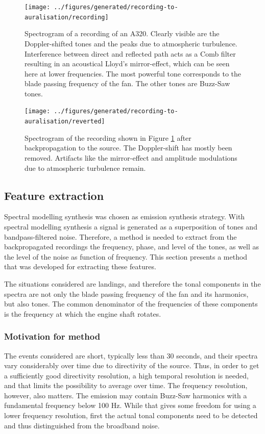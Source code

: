 \begin{figure}[H]
  \centering
  \texttt{[image: ../figures/generated/recording-to-auralisation/recording]}
  \caption{
    Spectrogram of a recording of an A320. Clearly visible are the
    Doppler-shifted tones and the peaks due to atmospheric turbulence.
    Interference between direct and reflected path acts as a Comb filter resulting
    in an acoustical Lloyd's mirror-effect, which can be seen here at lower
    frequencies. The most powerful tone corresponds to the blade passing frequency
    of the fan. The other tones are Buzz-Saw tones.}
  \label{fig:recording}
\end{figure}

\begin{figure}[H]
  \centering
  \texttt{[image: ../figures/generated/recording-to-auralisation/reverted]}
  \caption{Spectrogram of the recording shown in Figure \ref{fig:recording} after backpropagation to the source. The Doppler-shift has mostly been removed. Artifacts like the mirror-effect and amplitude modulations due to atmospheric turbulence remain.}
  \label{fig:backpropagated}
\end{figure}

\subsection{Feature extraction}
Spectral modelling synthesis was chosen as emission synthesis strategy. With
spectral modelling synthesis a signal is generated as a superposition of tones
and bandpass-filtered noise.
Therefore, a method is needed to extract from the backpropagated recordings the
frequency, phase, and level of the tones, as well as the level of the noise as
function of frequency. This section presents a method that was developed for
extracting these features.

The situations considered are landings, and therefore the tonal components in
the spectra are not only the blade passing frequency of the fan and its
harmonics, but also  tones. The common denominator of the
frequencies of these components is the frequency at which the engine shaft
rotates.

\subsubsection*{Motivation for method}
The events considered are short, typically less than 30 seconds, and their
spectra vary considerably over time due to directivity of the source. Thus, in
order to get a sufficiently good directivity resolution, a high temporal
resolution is needed, and that limits the possibility to average over time. The
frequency resolution, however, also matters. The emission may contain Buzz-Saw
harmonics with a fundamental frequency below 100 Hz. While that gives some
freedom for using a lower frequency resolution, first the actual tonal
components need to be detected and thus distinguished from the broadband noise.

